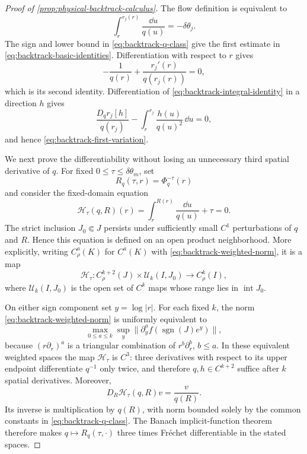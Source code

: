 \begin{proof}[Proof of \cref{prop:physical-backtrack-calculus}]
The flow definition is equivalent to
\begin{equation}
 \int_r^{r_j(r)}\frac{\dd u}{q(u)}=-\delta\theta_j.
                                                               \label{eq:backtrack-integral-identity}
\end{equation}
The sign and lower bound in \cref{eq:backtrack-q-class} give the first
estimate in \cref{eq:backtrack-basic-identities}.  Differentiation with
respect to \(r\) gives
\[
 -\frac1{q(r)}+\frac{r_j'(r)}{q(r_j(r))}=0,
\]
which is its second identity.  Differentiation of
\cref{eq:backtrack-integral-identity} in a direction \(h\) gives
\[
 \frac{D_qr_j[h]}{q(r_j)}
 -\int_r^{r_j}\frac{h(u)}{q(u)^2}\,\dd u=0,
\]
and hence \cref{eq:backtrack-first-variation}.

We next prove the differentiability without losing an unnecessary third
spatial derivative of \(q\).  For fixed
\(0\le\tau\le\delta\theta_m\), set
\[
 R_q(\tau,r)=\Phi_q^{-\tau}(r)
\]
and consider the fixed-domain equation
\begin{equation}
 \mathscr H_\tau(q,R)(r)
 =\int_r^{R(r)}\frac{\dd u}{q(u)}+\tau=0.           \label{eq:backtrack-implicit-map}
\end{equation}
The strict inclusion \(J_0\Subset J\) persists under sufficiently small
\(C^1\) perturbations of \(q\) and \(R\).  Hence this equation is defined on
an open product neighborhood.  More explicitly, writing
\(C^a_\rho(K)\) for \(C^a(K)\) with
\cref{eq:backtrack-weighted-norm}, it is a map
\[
 \mathscr H_\tau:
 C^{k+2}_\rho(J)\times\mathcal U_k(I,J_0)\longrightarrow C^k_\rho(I),
\]
where \(\mathcal U_k(I,J_0)\) is the open set of \(C^k\) maps whose range
lies in \(\operatorname{int}J_0\).

On either sign component set \(y=\log|r|\).  For each fixed \(k\), the norm
\cref{eq:backtrack-weighted-norm} is uniformly equivalent to
\begin{equation}
 \max_{0\le a\le k}\sup_y
   \|\partial_y^a f(\operatorname{sgn}(J)e^y)\|,    \label{eq:backtrack-log-norm}
\end{equation}
because \((r\partial_r)^a\) is a triangular combination of
\(r^b\partial_r^b\), \(b\le a\).  In these equivalent weighted spaces the
map \(\mathscr H_\tau\) is \(C^3\): three derivatives with respect to its
upper endpoint differentiate \(q^{-1}\) only twice, and therefore
\(q,h\in C^{k+2}\) suffice after \(k\) spatial derivatives.  Moreover,
\[
 D_R\mathscr H_\tau(q,R)v=\frac{v}{q(R)}.
\]
Its inverse is multiplication by \(q(R)\), with norm bounded solely by the
common constants in \cref{eq:backtrack-q-class}.  The Banach implicit-function
theorem therefore makes \(q\mapsto R_q(\tau,\cdot)\) three times
Fr\'{e}chet differentiable in the stated spaces.


\end{proof}
